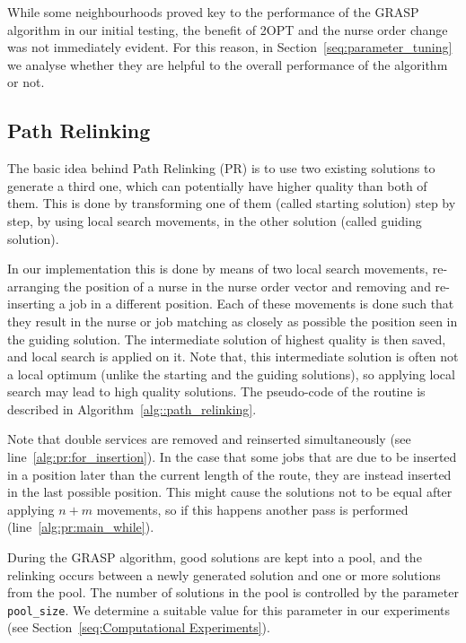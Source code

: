 \documentclass[a4paper,11pt]{elsarticle}
\begin{document}
While some neighbourhoods proved key to the performance of the GRASP algorithm in our initial testing, the benefit of 2OPT and the nurse order change was not immediately evident. For this reason, in Section~\ref{seq:parameter_tuning} we analyse whether they are helpful to the overall performance of the algorithm or not.

\subsection{Path Relinking}\label{subseq:PR}
The basic idea behind Path Relinking (PR) \citep{laguna1999grasp,resende2016optimization} is to use two existing solutions to generate a third one, which can potentially have higher quality than both of them.
This is done by transforming one of them (called starting solution) step by step, by using local search movements, in the other solution (called guiding solution).

In our implementation this is done by means of two local search movements, re-arranging the position of a nurse in the nurse order vector and removing and re-inserting a job in a different position. Each of these movements is done such that they result in the nurse or job matching as closely as possible the position seen in the guiding solution. The intermediate solution of highest quality is then saved, and local search is applied on it. Note that, this intermediate solution is often not a local optimum (unlike the starting and the guiding solutions), so applying local search may lead to high quality solutions. The pseudo-code of the routine is described in Algorithm~\ref{alg::path_relinking}.



Note that double services are removed and reinserted simultaneously (see line~\ref{alg:pr:for_insertion}). In the case that some jobs that are due to be inserted in a position later than the current length of the route, they are instead inserted in the last possible position. This might cause the solutions not to be equal after applying $n + m$ movements, so if this happens another pass is performed (line~\ref{alg:pr:main_while}).

During the GRASP algorithm, good solutions are kept into a pool, and the relinking occurs between a newly generated solution and one or more solutions from the pool.
The number of solutions in the pool is controlled by the parameter \texttt{pool\_size}. We determine a suitable value for this parameter in our experiments (see Section~\ref{seq:Computational Experiments}).
\end{document}
